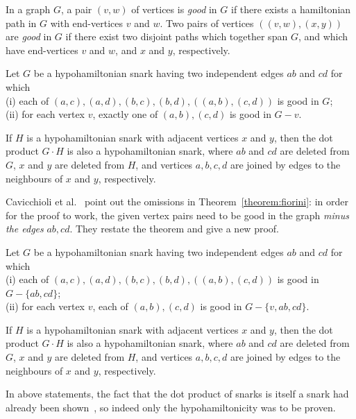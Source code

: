 \documentclass{amcjoucc}
\begin{document}
In a graph $G$, a pair $(v,w)$ of vertices is \emph{good} in $G$ if there exists a hamiltonian path in $G$ with end-vertices $v$ and $w$. Two pairs of vertices $((v,w),(x,y))$ are \emph{good} in $G$ if there exist two disjoint paths which together span $G$, and which have end-vertices $v$ and $w$, and $x$ and $y$, respectively.

\begin{theorem}\label{theorem:fiorini}
Let $G$ be a hypohamiltonian snark having two independent edges $ab$ and $cd$ for which\\
(i) each of $(a,c), (a,d), (b,c), (b,d), ((a,b),(c,d))$ is good in $G$;\\
(ii) for each vertex $v$, exactly one of $(a,b), (c,d)$ is good in $G - v$.\par
If $H$ is a hypohamiltonian snark with adjacent vertices $x$ and $y$, then the dot product $G \cdot H$ is also a hypohamiltonian snark, where $ab$ and $cd$ are deleted from $G$, $x$ and $y$ are deleted from $H$, and vertices $a, b, c, d$ are joined by edges to the neighbours of $x$ and $y$, respectively.
\end{theorem}

Cavicchioli et al.~\cite{CMRS03} point out the omissions in Theorem~\ref{theorem:fiorini}: in order for the proof to work, the given vertex pairs need to be good in the graph \emph{minus the edges} $ab, cd$. They restate the theorem and give a new proof.

\begin{theorem}\label{theorem:cav}
Let $G$ be a hypohamiltonian snark having two independent edges $ab$ and $cd$ for which\\
(i) each of $(a,c), (a,d), (b,c), (b,d), ((a,b),(c,d))$ is good in $G - \{ ab, cd \}$;\\
(ii) for each vertex $v$, each of $(a,b), (c,d)$ is good in $G - \{ v, ab, cd \}$.\par
If $H$ is a hypohamiltonian snark with adjacent vertices $x$ and $y$, then the dot product $G \cdot H$ is also a hypohamiltonian snark, where $ab$ and $cd$ are deleted from $G$, $x$ and $y$ are deleted from $H$, and vertices $a, b, c, d$ are joined by edges to the neighbours of $x$ and $y$, respectively.
\end{theorem}

In above statements, the fact that the dot product of snarks is itself a snark had already been shown~\cite{AT73,Is75}, so indeed only the hypohamiltonicity was to be proven.
\end{document}
